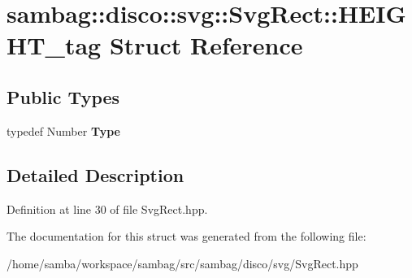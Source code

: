 \hypertarget{structsambag_1_1disco_1_1svg_1_1_svg_rect_1_1_h_e_i_g_h_t__tag}{
\section{sambag::disco::svg::SvgRect::HEIGHT\_\-tag Struct Reference}
\label{structsambag_1_1disco_1_1svg_1_1_svg_rect_1_1_h_e_i_g_h_t__tag}
}
\subsection*{Public Types}
\begin{DoxyCompactItemize}
\item 
\hypertarget{structsambag_1_1disco_1_1svg_1_1_svg_rect_1_1_h_e_i_g_h_t__tag_aa38f3f000fa8985e53d633bb6a3233e0}{
typedef Number {\bfseries Type}}
\label{structsambag_1_1disco_1_1svg_1_1_svg_rect_1_1_h_e_i_g_h_t__tag_aa38f3f000fa8985e53d633bb6a3233e0}

\end{DoxyCompactItemize}


\subsection{Detailed Description}


Definition at line 30 of file SvgRect.hpp.



The documentation for this struct was generated from the following file:\begin{DoxyCompactItemize}
\item 
/home/samba/workspace/sambag/src/sambag/disco/svg/SvgRect.hpp\end{DoxyCompactItemize}
